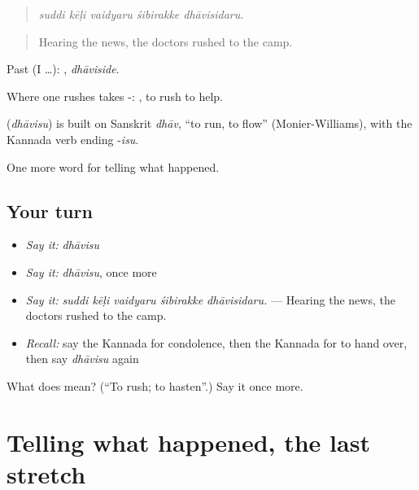 \begin{quote}
\emph{suddi kēḷi vaidyaru śibirakke dhāvisidaru.}
\end{quote}

\begin{quote}
Hearing the news, the doctors rushed to the camp.
\end{quote}

Past (I …): , \emph{dhāviside}.

Where one rushes takes -:  , to rush to help.

\begin{cousinweb}
\textbf{} (\emph{dhāvisu}) is built on Sanskrit \emph{dhāv}, \textquotedblleft{}to run, to flow\textquotedblright{} (Monier-Williams), with the Kannada verb ending -\emph{isu}.
\end{cousinweb}

\begin{grammarlens}[title={What you've built}]
One more word for telling what happened.
\end{grammarlens}

\subsection*{Your turn}
\begin{itemize}
\raggedright
  \item \emph{Say it:} \emph{dhāvisu}
  \item \emph{Say it:} \emph{dhāvisu}, once more
  \item \emph{Say it:} \emph{suddi kēḷi vaidyaru śibirakke dhāvisidaru.} — Hearing the news, the doctors rushed to the camp.
  \item \emph{Recall:} say the Kannada for condolence, then the Kannada for to hand over, then say \emph{dhāvisu} again
\end{itemize}

\begin{tcolorbox}[breakable,colback=teal!4,colframe=teal!35!black,title={Before you move on}]
What does  mean? (\textquotedblleft{}To rush; to hasten\textquotedblright{}.) Say it once more.
\end{tcolorbox}
\section[(dialogue)]{Telling what happened, the last stretch}

\label{lesson:KA-R375-review-369-375}




